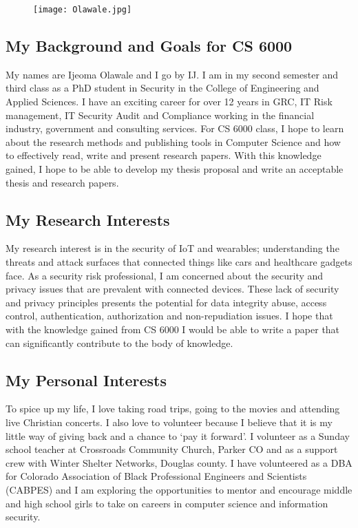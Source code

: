 \begin{figure}
\centering
\texttt{[image: Olawale.jpg]}
\end{figure}
\subsection{My Background and Goals for CS 6000}
My names are Ijeoma Olawale and I go by IJ. I am in my second semester and third class as a PhD student in Security in the College of Engineering and Applied Sciences. I have an exciting career for over 12 years in GRC, IT Risk management, IT Security Audit and Compliance working in the financial industry, government and consulting services. For CS 6000 class, I hope to learn about the research methods and publishing tools in Computer Science and how to effectively read, write and present research papers. With this knowledge gained, I hope to be able to develop my thesis proposal and write an acceptable thesis and research papers.
\subsection{My Research Interests}
My research interest is in the security of IoT and wearables; understanding the threats and attack surfaces that connected things like cars and healthcare gadgets face. As a security risk professional, I am concerned about the security and privacy issues that are prevalent with connected devices. These lack of security and privacy principles presents the potential for data integrity abuse, access control, authentication, authorization and non-repudiation issues. I hope that with the knowledge gained from CS 6000 I would be able to write a paper that can significantly contribute to the body of knowledge.
\subsection{My Personal Interests}
To spice up my life, I love taking road trips, going to the movies and attending live Christian concerts. I also love to volunteer because I believe that it is my little way of giving back and a chance to ‘pay it forward’. I volunteer as a Sunday school teacher at Crossroads Community Church, Parker CO and as a support crew with Winter Shelter Networks, Douglas county. I have volunteered as a DBA for Colorado Association of Black Professional Engineers and Scientists (CABPES) and I am exploring the opportunities to mentor and encourage middle and high school girls to take on careers in computer science and information security.


